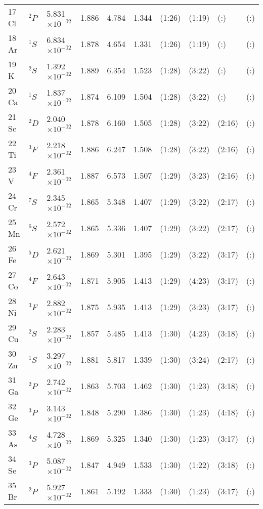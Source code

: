\documentclass[12pt]{book}
\begin{document}
\begin{center}
\begin{longtable}{l l l l l l l l l l}
17 Cl & $^{2}P$ & 5.831$\times10^{-02}$ & 1.886 & 4.784 & 1.344 & (1:26) & (1:19) & (:) & (:) \\
18 Ar & $^{1}S$ & 6.834$\times10^{-02}$ & 1.878 & 4.654 & 1.331 & (1:26) & (1:19) & (:) & (:) \\
19 K & $^{2}S$ & 1.392$\times10^{-02}$ & 1.889 & 6.354 & 1.523 & (1:28) & (3:22) & (:) & (:) \\
20 Ca & $^{1}S$ & 1.837$\times10^{-02}$ & 1.874 & 6.109 & 1.504 & (1:28) & (3:22) & (:) & (:) \\
21 Sc & $^{2}D$ & 2.040$\times10^{-02}$ & 1.878 & 6.160 & 1.505 & (1:28) & (3:22) & (2:16) & (:) \\
22 Ti & $^{3}F$ & 2.218$\times10^{-02}$ & 1.886 & 6.247 & 1.508 & (1:28) & (3:22) & (2:16) & (:) \\
23 V & $^{4}F$ & 2.361$\times10^{-02}$ & 1.887 & 6.573 & 1.507 & (1:29) & (3:23) & (2:16) & (:) \\
24 Cr & $^{7}S$ & 2.345$\times10^{-02}$ & 1.865 & 5.348 & 1.407 & (1:29) & (3:22) & (2:17) & (:) \\
25 Mn & $^{6}S$ & 2.572$\times10^{-02}$ & 1.865 & 5.336 & 1.407 & (1:29) & (3:22) & (2:17) & (:) \\
26 Fe & $^{5}D$ & 2.621$\times10^{-02}$ & 1.869 & 5.301 & 1.395 & (1:29) & (3:22) & (3:17) & (:) \\
27 Co & $^{4}F$ & 2.643$\times10^{-02}$ & 1.871 & 5.905 & 1.413 & (1:29) & (4:23) & (3:17) & (:) \\
28 Ni & $^{3}F$ & 2.882$\times10^{-02}$ & 1.875 & 5.935 & 1.413 & (1:29) & (3:23) & (3:17) & (:) \\
29 Cu & $^{2}S$ & 2.283$\times10^{-02}$ & 1.857 & 5.485 & 1.413 & (1:30) & (4:23) & (3:18) & (:) \\
30 Zn & $^{1}S$ & 3.297$\times10^{-02}$ & 1.881 & 5.817 & 1.339 & (1:30) & (3:24) & (2:17) & (:) \\
31 Ga & $^{2}P$ & 2.742$\times10^{-02}$ & 1.863 & 5.703 & 1.462 & (1:30) & (1:23) & (3:18) & (:) \\
32 Ge & $^{3}P$ & 3.143$\times10^{-02}$ & 1.848 & 5.290 & 1.386 & (1:30) & (1:23) & (4:18) & (:) \\
33 As & $^{4}S$ & 4.728$\times10^{-02}$ & 1.869 & 5.325 & 1.340 & (1:30) & (1:23) & (3:17) & (:) \\
34 Se & $^{3}P$ & 5.087$\times10^{-02}$ & 1.847 & 4.949 & 1.533 & (1:30) & (1:22) & (3:18) & (:) \\
35 Br & $^{2}P$ & 5.927$\times10^{-02}$ & 1.861 & 5.192 & 1.333 & (1:30) & (1:23) & (3:17) & (:) \\

\end{longtable}
\end{center}
\end{document}
